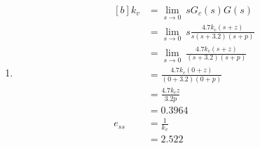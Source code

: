 \documentclass[12pt]{article}
\begin{document}
\begin{enumerate}
    \item %
    \begin{equation*}
    \begin{aligned}[b]
        k_v &= \lim_{s \to 0} \ sG_c(s)G(s) \\
        &= \lim_{s \to 0} \ s \frac{4.7 k_c (s + z)}{s(s + 3.2)(s + p)} \\
        &= \lim_{s \to 0} \ \frac{4.7 k_c (s + z)}{(s + 3.2)(s + p)} \\
        &= \frac{4.7 k_c (0 + z)}{(0 + 3.2)(0 + p)} \\
        &= \frac{4.7 k_c z}{3.2 p} \\
        &= 0.3964 \\
        e_{ss} &= \frac{1}{k_v} \\
        &= 2.522
    \end{aligned}
    \end{equation*}
\end{enumerate}
\end{document}
